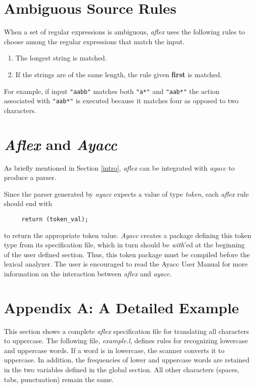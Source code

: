 \section{Ambiguous Source Rules}
When a set of regular expressions is ambiguous, {\sl aflex} uses the
following rules to choose among the regular expressions that match
the input.
\begin{enumerate}
    \item The longest string is matched.
    \item If the strings are of the same length, the rule given
	  {\bf first} is matched.
\end{enumerate}

For example, if input \verb|"aabb"| matches both \verb|"a*"| and
\verb|"aab*"| the action associated with \verb|"aab*"| is executed
because it matches four as opposed to two characters.

\section{{\sl Aflex} and {\sl Ayacc}}
\label{alexayacc}
As briefly mentioned in Section \ref{intro}, {\sl aflex} can be integrated with
{\sl ayacc} to produce a parser.

\mysk
Since the parser generated by {\sl ayacc} expects a value of type {\it token},
each {\sl aflex} rule should end with 

\begin{verbatim}
     return (token_val);
\end{verbatim}

to return the appropriate token value.  {\sl Ayacc} creates a package
defining this token type from its specification file, which in turn 
should be {\it with}'ed at the beginning of the user defined section.
Thus, this token package must be compiled before the lexical analyzer.
The user is encouraged to read the Ayacc User Manual \cite{ayacc} for 
more information on the interaction between {\sl aflex} and {\sl ayacc}.


\newpage
\section{Appendix A: A Detailed Example}

This section shows a complete {\sl aflex} specification file for translating all
characters to uppercase.  The following file,
{\it example.l}, defines rules for recognizing lowercase and uppercase words.
If a word is in lowercase, the scanner converts it to uppercase.
In addition, the frequencies of lower and uppercase words
are retained in the two variables defined in the global section.
All other characters (spaces, tabs, punctuation) remain the same.

